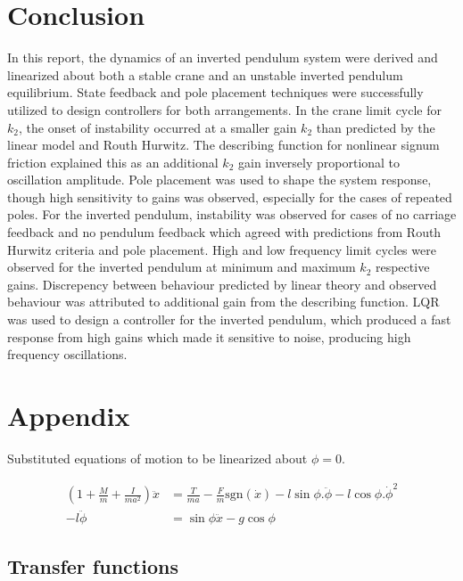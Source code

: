 \documentclass{article}
\begin{document}


\section{Conclusion}

In this report, the dynamics of an inverted pendulum system were derived and linearized about both a stable crane and an unstable inverted pendulum equilibrium.
State feedback and pole placement techniques were successfully utilized to design controllers for both arrangements.
In the crane limit cycle for $k_2$, the onset of instability occurred at a smaller gain $k_2$ than predicted by the linear model and Routh Hurwitz.
The describing function for nonlinear signum friction explained this as an additional $k_2$ gain inversely proportional to oscillation amplitude.
Pole placement was used to shape the system response, though high sensitivity to gains was observed, especially for the cases of repeated poles.
For the inverted pendulum, instability was observed for cases of no carriage feedback and no pendulum feedback 
which agreed with predictions from Routh Hurwitz criteria and pole placement.
High and low frequency limit cycles were observed for the inverted pendulum at minimum and maximum $k_2$ respective gains.
Discrepency between behaviour predicted by linear theory and observed behaviour was attributed to additional gain from the describing function.
LQR was used to design a controller for the inverted pendulum, which produced a fast response from high gains which made it sensitive to noise, producing high frequency oscillations.


\newpage
\section{Appendix}

Substituted equations of motion to be linearized about $\phi = 0$.

\begin{align}
  \left( 1 + \frac{M}{m} + \frac{I}{ma^2} \right) \ddot{x} &= \frac{T}{ma} - \frac{F}{m}\text{sgn}(\dot{x}) - l\sin\phi . \ddot{\phi} - l\cos\phi . \dot{\phi}^2 \\
   - l \ddot{\phi} &= \sin\phi \ddot{x} - g\cos\phi
\end{align}

\subsection{Transfer functions}
\end{document}
